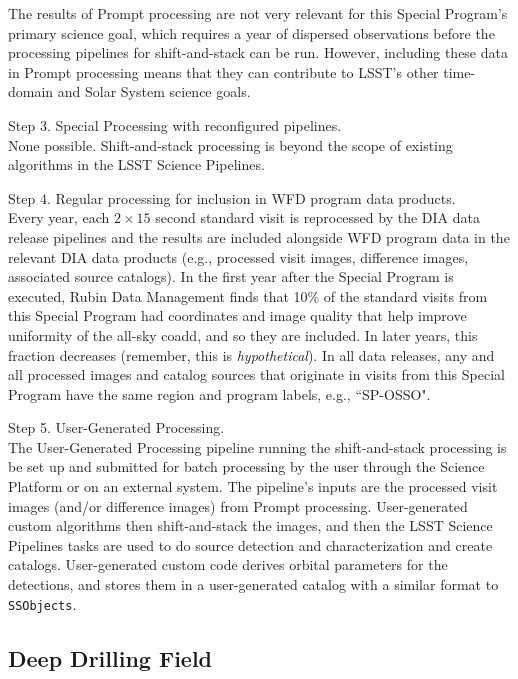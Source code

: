 The results of Prompt processing are not very relevant for this Special Program's primary science goal,
which requires a year of dispersed observations before the processing pipelines for shift-and-stack can be run.
However, including these data in Prompt processing means that
they can contribute to LSST's other time-domain and Solar System science goals.

Step 3. Special Processing with reconfigured pipelines. \\
None possible. 
Shift-and-stack processing is beyond the scope of existing algorithms in the LSST Science Pipelines.

Step 4. Regular processing for inclusion in WFD program data products. \\
Every year, each $2\times15$ second standard visit is reprocessed by the DIA data release pipelines
and the results are included alongside WFD program data in the relevant DIA data products
(e.g., processed visit images, difference images, associated source catalogs).
In the first year after the Special Program is executed,
Rubin Data Management finds that 10\% of the standard visits from this Special Program
had coordinates and image quality that help improve uniformity of the all-sky coadd,
and so they are included.
In later years, this fraction decreases (remember, this is \emph{hypothetical}).
In all data releases, any and all processed images and catalog sources that originate in visits from this Special Program
have the same region and program labels, e.g., ``SP-OSSO".

Step 5. User-Generated Processing. \\
The User-Generated Processing pipeline running the shift-and-stack processing is be set up and submitted 
for batch processing by the user through the Science Platform or on an external system. 
The pipeline's inputs are the processed visit images (and/or difference images) from Prompt processing.
User-generated custom algorithms then shift-and-stack the images, and then the LSST Science Pipelines
tasks are used to do source detection and characterization and create catalogs.
User-generated custom code derives orbital parameters for the detections, and stores
them in a user-generated catalog with a similar format to {\tt SSObjects}.


\subsection{Deep Drilling Field}\label{ssec:SPCS_SNDDF}

